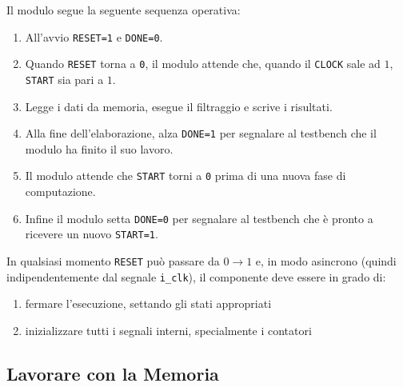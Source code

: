 \documentclass{article}
\begin{document}
\noindent Il modulo segue la seguente sequenza operativa:
\begin{enumerate}
    \item All'avvio \texttt{RESET=1} e \texttt{DONE=0}.
    \item Quando \texttt{RESET} torna a \texttt{0}, il modulo attende che, quando il \texttt{CLOCK} sale ad $1$, \texttt{START} sia pari a $1$.
    \item Legge i dati da memoria, esegue il filtraggio e scrive i risultati.
    \item Alla fine dell'elaborazione, alza \texttt{DONE=1} per segnalare al testbench che il modulo ha finito il suo lavoro.
    \item Il modulo attende che \texttt{START} torni a \texttt{0} prima di una nuova fase di computazione.
    \item Infine il modulo setta \texttt{DONE=0} per segnalare al testbench che è pronto a ricevere un nuovo \texttt{START=1}.
\end{enumerate}

In qualsiasi momento \texttt{RESET} può passare da $0 \to 1$ e, in modo asincrono (quindi indipendentemente dal segnale \texttt{i\_clk}), il componente deve essere in grado di:
\begin{enumerate}
    \item fermare l'esecuzione, settando gli stati appropriati
    \item inizializzare tutti i segnali interni, specialmente i contatori
\end{enumerate}

\subsection{Lavorare con la Memoria}\label{subsubsec:memoria}
\end{document}
